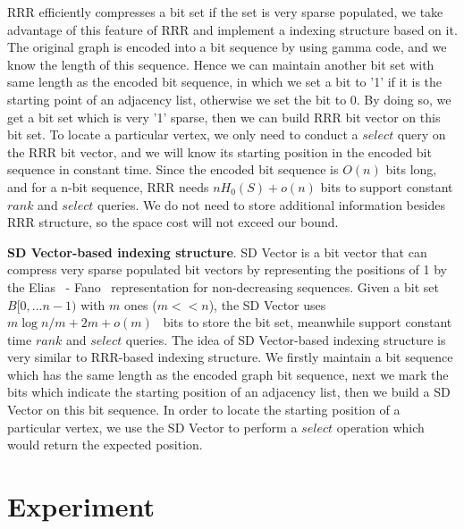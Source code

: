 \documentclass[12pt,glossary]{dalthesis}
\begin{document}
\bigskip
\bigskip

RRR efficiently compresses a bit set if the set is very sparse populated, we take advantage of this feature of RRR and implement a indexing structure based on it. The original graph is encoded into a bit sequence by using gamma code, and we know the length of this sequence. Hence we can maintain another bit set with same length as the encoded bit sequence, in which we set a bit to '1' if it is the starting point of an adjacency list, otherwise we set the bit to 0. By doing so, we get a bit set which is very '1' sparse, then we can build RRR bit vector on this bit set. To locate a particular vertex, we only need to conduct a $select$ query on the RRR bit vector, and we will know its starting position in the encoded bit sequence in constant time. Since the encoded bit sequence is $O(n)$ bits long, and for a n-bit sequence, RRR needs $nH_{0}(S)+o(n)$ bits to support constant $rank$ and $select$ queries. We do not need to store additional information besides RRR structure, so the space cost will not exceed our bound. 

\bigskip
\bigskip

\textbf{SD Vector-based indexing structure}. SD Vector is a bit vector that can compress very sparse populated bit vectors by representing the positions of 1 by the Elias~\cite{Elias} - Fano~\cite{Fano} representation for non-decreasing sequences. Given a bit set $B[0,...n-1)$ with $m$ ones ($m << n$),   the SD Vector uses $m \log n/m  + 2m + o(m)$~\cite{Practical-Entropy} bits to store the bit set, meanwhile support constant time $rank$ and $select$ queries. The idea of SD Vector-based indexing structure is very similar to RRR-based indexing structure. We firstly maintain a bit sequence which has the same length as the encoded graph bit sequence, next we mark the bits which indicate the starting position of an adjacency list, then we build a SD Vector on this bit sequence. In order to locate the starting position of a particular vertex, we use the SD Vector to perform a $select$ operation which would return the expected position. 


\chapter{Experiment}
\end{document}
